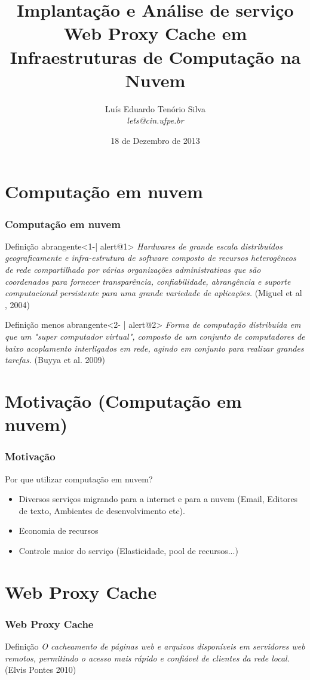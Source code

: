 \documentclass{beamer}
\title[TCC]{Implantação e Análise de serviço Web Proxy Cache em Infraestruturas de Computação na Nuvem}
\author{Luís Eduardo Tenório Silva\\\textit{lets@cin.ufpe.br}}
\date[18/12/13]{18 de Dezembro de 2013}
\begin{document}
    \frame{\titlepage}

    \frame{\footnotesize{\tableofcontents}}
    \section{Computação em nuvem}
    \begin{frame}
      \frametitle{Computação em nuvem}
      \begin{block}{Definição abrangente}<1-| alert@1>
      \textit{Hardwares de grande escala distribuídos geograficamente e infra-estrutura de software composto de recursos heterogêneos de rede compartilhado por várias organizações administrativas que são coordenados para fornecer transparência, confiabilidade, abrangência e suporte computacional persistente para uma grande variedade de aplicações.} (Miguel et
al , 2004)
    \end{block}    
    \begin{block}{Definição menos abrangente}<2- | alert@2>
      \textit{Forma de computação distribuída em que um "super computador virtual", composto de um conjunto de computadores de baixo
acoplamento interligados em rede, agindo em conjunto para realizar grandes tarefas.} (Buyya et al. 2009)
     \end{block}       
    \end{frame}
    \section{Motivação (Computação em nuvem)}
    \begin{frame}
      \frametitle{Motivação}
      Por que utilizar computação em nuvem?
      \begin{itemize}
       \item <2->Diversos serviços migrando para a internet e para a nuvem (Email, Editores de texto, Ambientes de desenvolvimento etc).
       \item <3->Economia de recursos
       \item <4->Controle maior do serviço (Elasticidade, pool de recursos...)
      \end{itemize}
    \end{frame}
    \section{Web Proxy Cache}
    \begin{frame}
      \frametitle{Web Proxy Cache}
      \begin{block}{Definição}
	\textit{O cacheamento de páginas web e arquivos disponíveis em servidores web remotos, permitindo o acesso mais rápido e
confiável de clientes da rede local.} (Elvis Pontes 2010)
      \end{block}
    \end{frame}
\end{document}
